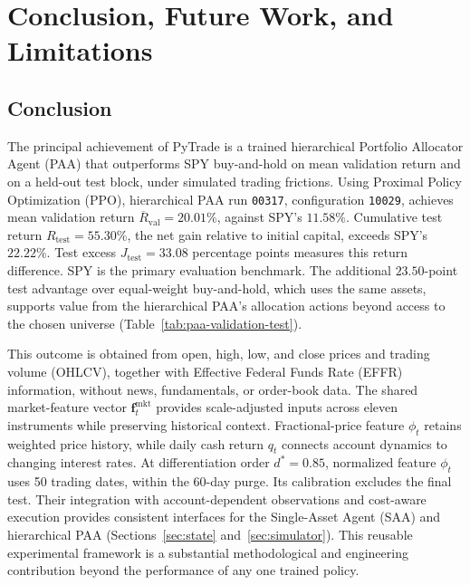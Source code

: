 \section{Conclusion, Future Work, and Limitations}
\label{sec:conclusion}

\subsection{Conclusion}

The principal achievement of PyTrade is a trained hierarchical Portfolio Allocator Agent (PAA) that outperforms SPY buy-and-hold on mean validation return and on a held-out test block, under simulated trading frictions. Using Proximal Policy Optimization (PPO), hierarchical PAA run \texttt{00317}, configuration \texttt{10029}, achieves mean validation return \(\overline R_{\mathrm{val}}=20.01\%\), against SPY's \(11.58\%\). Cumulative test return \(R_{\mathrm{test}}=55.30\%\), the net gain relative to initial capital, exceeds SPY's \(22.22\%\). Test excess \(J_{\mathrm{test}}=33.08\) percentage points measures this return difference. SPY is the primary evaluation benchmark. The additional \(23.50\)-point test advantage over equal-weight buy-and-hold, which uses the same assets, supports value from the hierarchical PAA's allocation actions beyond access to the chosen universe (Table~\ref{tab:paa-validation-test}).

This outcome is obtained from open, high, low, and close prices and trading volume (OHLCV), together with Effective Federal Funds Rate (EFFR) information, without news, fundamentals, or order-book data. The shared market-feature vector \(\mathbf f_t^{\mathrm{mkt}}\) provides scale-adjusted inputs across eleven instruments while preserving historical context. Fractional-price feature \(\phi_t\) retains weighted price history, while daily cash return \(q_t\) connects account dynamics to changing interest rates. At differentiation order \(d^\ast=0.85\), normalized feature \(\phi_t\) uses 50 trading dates, within the 60-day purge. Its calibration excludes the final test. Their integration with account-dependent observations and cost-aware execution provides consistent interfaces for the Single-Asset Agent (SAA) and hierarchical PAA (Sections~\ref{sec:state} and~\ref{sec:simulator}). This reusable experimental framework is a substantial methodological and engineering contribution beyond the performance of any one trained policy.

